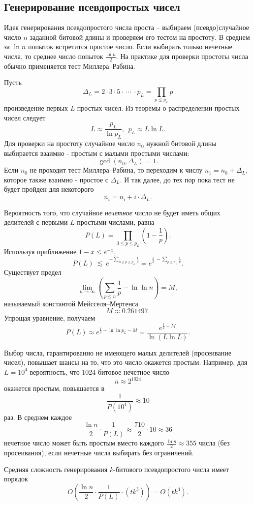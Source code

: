 \subsection{Генерирование псевдопростых чисел}

Идея генерирования псевдопростого числа проста -- выбираем (псевдо)случайное число $n$ заданной битовой длины и проверяем его тестом на простоту. В среднем за $\ln n$ попыток встретится простое число. Если выбирать только нечетные числа, то среднее число попыток $\frac{\ln n}{2}$. На практике для проверки простоты числа обычно применяется тест Миллера--Рабина.

Пусть
    \[ \Delta_L = 2 \cdot 3 \cdot 5 \cdot ~\cdots~ \cdot p_L = \prod \limits_{p \leq p_L} p \]
произведение первых $L$ простых чисел. Из теоремы о распределении простых чисел следует
    \[ L \approx \frac{p_L}{\ln p_L}, ~~ p_L \approx L \ln L. \]
Для проверки на простоту случайное число $n_0$ нужной битовой длины выбирается взаимно - простым с малыми простыми числами:
    \[ \gcd(n_0, \Delta_L) = 1. \]
Если $n_0$ не проходит тест Миллера--Рабина, то переходим к числу $n_1 = n_0 + \Delta_L$, которое также взаимно - простое с $\Delta_L$. И так далее, до тех пор пока тест не будет пройден  для некоторого
    \[ n_i = n_i + i \cdot \Delta_L. \]

Вероятность того, что случайное \textit{нечетное} число не будет иметь общих делителей с первыми $L$ простыми числами, равна
    \[ P(L) = \prod \limits_{3 \leq p \leq p_L} \left( 1 - \frac{1}{p} \right). \]
Используя приближение $1-x \leq e^{-x}$,
    \[ P(L) ~\lesssim~ e^{-\sum\limits_{3 \leq p \leq p_L} \frac{1}{p}} = e^{\frac{1}{2} ~ - \sum\limits_{p \leq p_L} \frac{1}{p}}. \]
Существует предел
    \[ \lim \limits_{n \rightarrow \infty} \left( \sum \limits_{p \leq n} \frac{1}{p} - \ln \ln n \right) = M, \]
называемый константой Мейсселя--Мертенса
    \[ M \approx 0.261497. \]
Упрощая уравнение, получаем
    \[ P(L) \approx e^{\frac{1}{2} - \ln \ln p_L - M} = \frac{e^{\frac{1}{2} - M}}{\ln(L \ln L)}. \]

Выбор числа, гарантированно не имеющего малых делителей (просеивание чисел), повышает шансы на то, что это число окажется простым. Например, для $L = 10^4$ вероятность, что 1024-битовое нечетное число
    \[ n \approx 2^{1024} \]
окажется простым, повышается в
    \[ \frac{1}{P(10^4)} \approx 10 \]
раз. В среднем каждое
    \[ \frac{\ln n}{2} \cdot \frac{1}{P(L)} \approx \frac{710}{2} \cdot 10 \approx 36 \]
нечетное число может быть простым вместо каждого $\frac{\ln n}{2} \approx 355$ числа (без просеивания), если нечетные числа выбирать без ограничений.

Средняя сложность генерирования $k$-битового псевдопростого числа имеет порядок
    \[ O \left( \frac{\ln n}{2} \cdot \frac{1}{P(L)} \cdot \left( t k^3 \right) \right) = O(t k^4). \]
